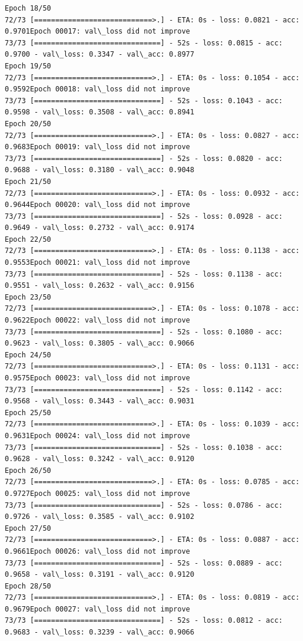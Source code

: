 \documentclass[11pt]{article}
\begin{document}
\begin{Verbatim}[commandchars=\\\{\}]
Epoch 18/50
72/73 [============================>.] - ETA: 0s - loss: 0.0821 - acc: 0.9701Epoch 00017: val\_loss did not improve
73/73 [==============================] - 52s - loss: 0.0815 - acc: 0.9700 - val\_loss: 0.3347 - val\_acc: 0.8977
Epoch 19/50
72/73 [============================>.] - ETA: 0s - loss: 0.1054 - acc: 0.9592Epoch 00018: val\_loss did not improve
73/73 [==============================] - 52s - loss: 0.1043 - acc: 0.9598 - val\_loss: 0.3508 - val\_acc: 0.8941
Epoch 20/50
72/73 [============================>.] - ETA: 0s - loss: 0.0827 - acc: 0.9683Epoch 00019: val\_loss did not improve
73/73 [==============================] - 52s - loss: 0.0820 - acc: 0.9688 - val\_loss: 0.3180 - val\_acc: 0.9048
Epoch 21/50
72/73 [============================>.] - ETA: 0s - loss: 0.0932 - acc: 0.9644Epoch 00020: val\_loss did not improve
73/73 [==============================] - 52s - loss: 0.0928 - acc: 0.9649 - val\_loss: 0.2732 - val\_acc: 0.9174
Epoch 22/50
72/73 [============================>.] - ETA: 0s - loss: 0.1138 - acc: 0.9553Epoch 00021: val\_loss did not improve
73/73 [==============================] - 52s - loss: 0.1138 - acc: 0.9551 - val\_loss: 0.2632 - val\_acc: 0.9156
Epoch 23/50
72/73 [============================>.] - ETA: 0s - loss: 0.1078 - acc: 0.9622Epoch 00022: val\_loss did not improve
73/73 [==============================] - 52s - loss: 0.1080 - acc: 0.9623 - val\_loss: 0.3805 - val\_acc: 0.9066
Epoch 24/50
72/73 [============================>.] - ETA: 0s - loss: 0.1131 - acc: 0.9575Epoch 00023: val\_loss did not improve
73/73 [==============================] - 52s - loss: 0.1142 - acc: 0.9568 - val\_loss: 0.3443 - val\_acc: 0.9031
Epoch 25/50
72/73 [============================>.] - ETA: 0s - loss: 0.1039 - acc: 0.9631Epoch 00024: val\_loss did not improve
73/73 [==============================] - 52s - loss: 0.1038 - acc: 0.9628 - val\_loss: 0.3242 - val\_acc: 0.9120
Epoch 26/50
72/73 [============================>.] - ETA: 0s - loss: 0.0785 - acc: 0.9727Epoch 00025: val\_loss did not improve
73/73 [==============================] - 52s - loss: 0.0786 - acc: 0.9726 - val\_loss: 0.3585 - val\_acc: 0.9102
Epoch 27/50
72/73 [============================>.] - ETA: 0s - loss: 0.0887 - acc: 0.9661Epoch 00026: val\_loss did not improve
73/73 [==============================] - 52s - loss: 0.0889 - acc: 0.9658 - val\_loss: 0.3191 - val\_acc: 0.9120
Epoch 28/50
72/73 [============================>.] - ETA: 0s - loss: 0.0819 - acc: 0.9679Epoch 00027: val\_loss did not improve
73/73 [==============================] - 52s - loss: 0.0812 - acc: 0.9683 - val\_loss: 0.3239 - val\_acc: 0.9066

\end{Verbatim}
\end{document}
